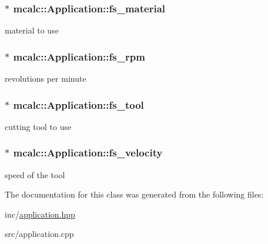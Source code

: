 \subsubsection[{\texorpdfstring{fs\+\_\+material}{fs_material}}]{$\ast$ mcalc\+::\+Application\+::fs\+\_\+material\hspace{0.3cm}{\ttfamily [protected]}}\hypertarget{classmcalc_1_1Application_a8c78f8ea0615db28858001aa5ed6b7b6}{}\label{classmcalc_1_1Application_a8c78f8ea0615db28858001aa5ed6b7b6}
material to use 
\subsubsection[{\texorpdfstring{fs\+\_\+rpm}{fs_rpm}}]{$\ast$ mcalc\+::\+Application\+::fs\+\_\+rpm\hspace{0.3cm}{\ttfamily [protected]}}\hypertarget{classmcalc_1_1Application_a4b08a214c34fcb417f5cd14ca2e479c0}{}\label{classmcalc_1_1Application_a4b08a214c34fcb417f5cd14ca2e479c0}
revolutions per minute 
\subsubsection[{\texorpdfstring{fs\+\_\+tool}{fs_tool}}]{$\ast$ mcalc\+::\+Application\+::fs\+\_\+tool\hspace{0.3cm}{\ttfamily [protected]}}\hypertarget{classmcalc_1_1Application_a9775057e24515e6e3cf8c1c9a3144512}{}\label{classmcalc_1_1Application_a9775057e24515e6e3cf8c1c9a3144512}
cutting tool to use 
\subsubsection[{\texorpdfstring{fs\+\_\+velocity}{fs_velocity}}]{$\ast$ mcalc\+::\+Application\+::fs\+\_\+velocity\hspace{0.3cm}{\ttfamily [protected]}}\hypertarget{classmcalc_1_1Application_a6d4441380476fcbdafe23b28da5f6647}{}\label{classmcalc_1_1Application_a6d4441380476fcbdafe23b28da5f6647}
speed of the tool 

The documentation for this class was generated from the following files\+:\begin{DoxyCompactItemize}
\item 
inc/\hyperlink{application_8hpp}{application.\+hpp}\item 
src/application.\+cpp\end{DoxyCompactItemize}
